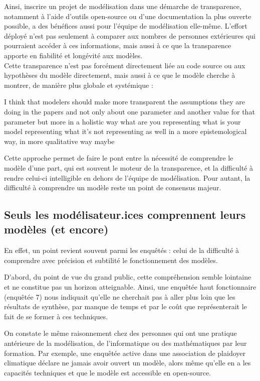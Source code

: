 Ainsi, inscrire un projet de modélisation dans une démarche de transparence, notamment à l'aide d'outils open-source ou d'une documentation la plus ouverte possible, a des bénéfices aussi pour l'équipe de modélisation elle-même. L'effort déployé n'est pas seulement à comparer aux nombres de personnes extérieures qui pourraient accéder à ces informations, mais aussi à ce que la transparence apporte en fiabilité et longévité aux modèles. \\

Cette transparence n'est pas forcément directement liée au code source ou aux hypothèses du modèle directement, mais aussi à ce que le modèle cherche à montrer, de manière plus globale et systémique : 

\begin{authoredquote}
    I think that modelers should make more transparent the assumptions they are doing in the papers and not only about one parameter and another value for that parameter but more in a holistic way what are you representing what is your model  representing what it's not representing as well in a more epistemological way, in more qualitative way maybe
\end{authoredquote}

Cette approche permet de faire le pont entre la nécessité de comprendre le modèle d'une part, qui est souvent le moteur de la transparence, et la difficulté à rendre celui-ci intelligible en dehors de l'équipe de modélisation. Pour autant, la difficulté à comprendre un modèle reste un point de consensus majeur. 

\subsection{Seuls les modélisateur.ices comprennent leurs modèles (et encore)}

En effet, un point revient souvent parmi les enquêtés : celui de la difficulté à comprendre avec précision et subtilité le fonctionnement des modèles.

D'abord, du point de vue du grand public, cette compréhension semble lointaine et ne constitue pas un horizon atteignable. Ainsi, une enquêtée haut fonctionnaire (enquêtée 7) nous indiquait qu'elle ne cherchait pas à aller plus loin que les résultats de synthèse, par manque de temps et par le coût que représenterait le fait de se former à ces techniques. 


On constate le même raisonnement chez des personnes qui ont une pratique antérieure de la modélisation, de l'informatique ou des mathématiques par leur formation. Par exemple, une enquêtée active dans une association de plaidoyer climatique déclare ne jamais avoir ouvert un modèle, alors même qu'elle en a les capacités techniques et que le modèle est accessible en open-source. 

